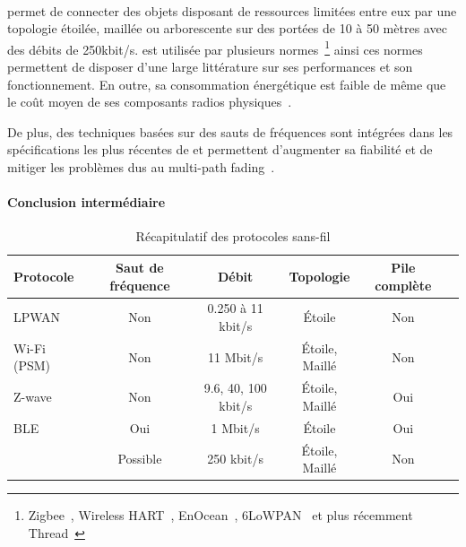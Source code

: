 \paragraph{\ieee{}}

\ieee{} permet de connecter des objets disposant de ressources limitées entre eux par une topologie étoilée, maillée ou arborescente sur des portées de 10 à 50 mètres avec des débits de 250kbit/s.
\ieee{} est utilisée par plusieurs normes~\footnote{Zigbee~\cite{alliance2006zigbee, zigbeeCritic}, Wireless HART~\cite{lennvall2008comparison}, EnOcean~\cite{ploennigs2010performance}, \ac{6LoWPAN}~\cite{shelby20116lowpan} et plus récemment Thread~\cite{threadCritic}} ainsi ces normes permettent de disposer d'une large littérature sur ses performances et son fonctionnement.
En outre, sa consommation énergétique est faible de même que le coût moyen de ses composants radios physiques~\cite{vilajosana2015openmote}.

De plus, des techniques basées sur des sauts de fréquences sont intégrées dans les spécifications les plus récentes de \ieee{} et permettent d'augmenter sa fiabilité et de mitiger les problèmes dus au multi-path fading~\cite{6tisch}.

\paragraph{Conclusion intermédiaire}

\begin{table}[t]
\centering
\begin{tabular}{|l|c|c|c|c|c|}
\hline
Protocole & Saut de fréquence & Débit & Topologie & Pile complète \\
\hline
LPWAN & Non & 0.250 à 11 kbit/s & Étoile & Non \\
\hline
Wi-Fi (PSM) & Non & 11 Mbit/s & Étoile, Maillé & Non \\
\hline
Z-wave & Non & 9.6, 40, 100 kbit/s & Étoile, Maillé &  Oui \\
\hline
\ac{BLE} & Oui & 1 Mbit/s & Étoile & Oui \\
\hline
\ieee{} & Possible & 250 kbit/s & Étoile, Maillé & Non \\
\hline
\end{tabular}
\caption{Récapitulatif des protocoles sans-fil}

\label{gw:table:protocol_recap}
\end{table}

